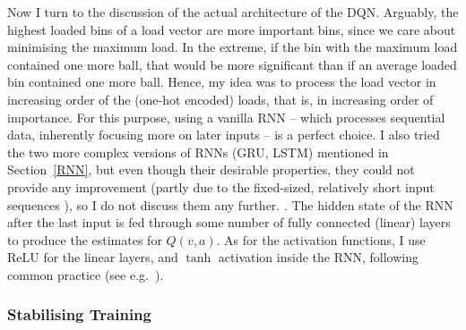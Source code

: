 Now I turn to the discussion of the actual architecture of the DQN. Arguably, the highest loaded bins of a load vector are more important bins, since we care about minimising the maximum load. In the extreme, if the bin with the maximum load contained one more ball, that would be more significant than if an average loaded bin contained one more ball. Hence, my idea was to process the load vector in increasing order of the (one-hot encoded) loads, that is, in increasing order of importance. For this purpose, using a vanilla RNN -- which processes sequential data, inherently focusing more on later inputs -- is a perfect choice. I also tried the two more complex versions of RNNs (GRU, LSTM) mentioned in Section~\ref{RNN}, but even though their desirable properties, they could not provide any improvement (partly due to the fixed-sized, relatively short input sequences ), so I do not discuss them any further. .
The hidden state of the RNN after the last input is fed through some number of fully connected (linear) layers to produce the estimates for $Q(v, a)$. As for the activation functions, I use ReLU for the linear layers, and $\tanh$ activation inside the RNN, following common practice (see e.g.~\cite{szandala2020activationfunctions}).


\subsubsection{Stabilising Training}


